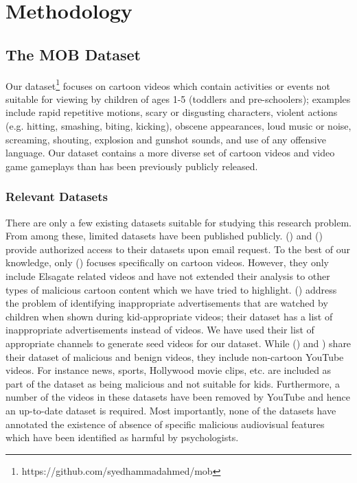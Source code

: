 \documentclass[letterpaper]{article}
\begin{document}
\section{Methodology}\label{M}
\subsection{The MOB Dataset}\label{DS}
Our dataset\footnote{https://github.com/syedhammadahmed/mob} focuses on cartoon videos which contain activities or events not suitable for viewing by children of ages 1-5 (toddlers and pre-schoolers); examples include rapid repetitive motions, scary or disgusting characters, violent actions (e.g. hitting, smashing, biting, kicking),  obscene appearances, loud music or noise, screaming, shouting, explosion and gunshot sounds, and use of any offensive language.  Our dataset contains a more diverse set of cartoon videos and video game gameplays than has been previously publicly released.
\subsubsection{Relevant Datasets}
There are only a few existing datasets suitable for studying this research problem.
From among these, limited datasets have been published publicly. \citeauthor{6} (\citeyear{6}) and \citeauthor{9} (\citeyear{9}) provide authorized access to their datasets upon email request. To the best of our knowledge, only \citeauthor{11} (\citeyear{11}) focuses specifically on cartoon videos. 
 However, they only include Elsagate related videos and have not extended their analysis to other types of malicious cartoon content which we have tried to highlight. \citeauthor{4} (\citeyear{4}) address the problem of identifying inappropriate advertisements that are watched by children when shown during kid-appropriate videos; their dataset has a list of inappropriate advertisements instead of videos. We have used their list of appropriate channels to generate seed videos for our dataset. While \citeauthor{1} (\citeyear{1}) and \citeauthor{5} {\citeyear{5}}) share their dataset of malicious and benign videos, they include non-cartoon YouTube videos. For instance news, sports, Hollywood movie clips, etc. are included as part of the dataset as being malicious and not suitable for kids. Furthermore, a number of the videos in these datasets have been removed by YouTube and hence an up-to-date dataset is required. Most importantly, none of the datasets have annotated the existence of absence of specific malicious audiovisual features which have been identified as harmful by psychologists.
\end{document}
